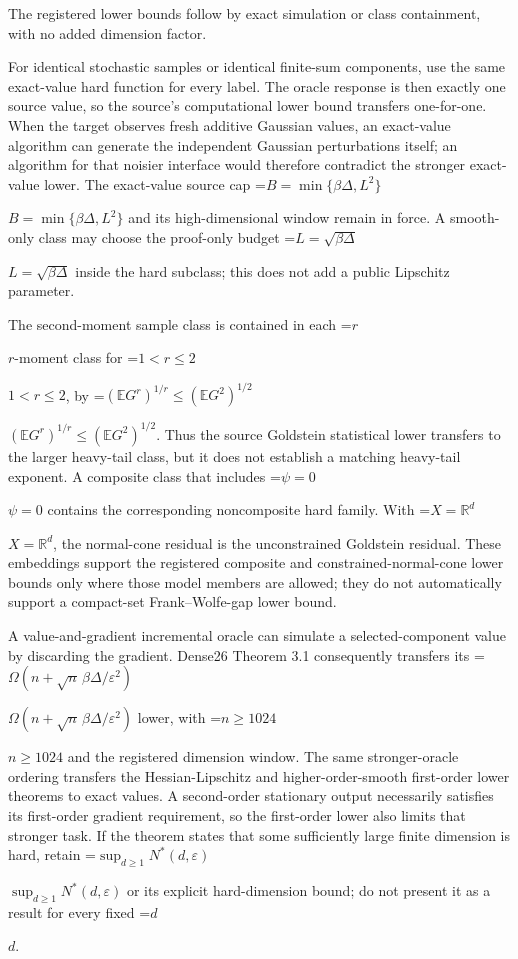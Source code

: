 \documentclass[10pt,a4paper]{article}
\newcommand{\AtlasMath}[1]{\par\begingroup\centering\setbox0=\hbox{$\displaystyle #1$}\ifdim\wd0>1.4\linewidth\typeout{ATLAS WIDE FORMULA: \the\wd0}\fi\ifdim\wd0>\linewidth\resizebox{\linewidth}{!}{\box0}\else\box0\fi\par\endgroup}
\newcommand{\AtlasInlineMath}[1]{\begingroup\setbox0=\hbox{$#1$}\ifdim\wd0>.4\linewidth\endgroup\AtlasMath{#1}\else\endgroup$#1$\fi}
\begin{document}
The registered lower bounds follow by exact simulation or class containment, with no added dimension factor.

For identical stochastic samples or identical finite-sum components, use the same exact-value hard function for every label. The oracle response is then exactly one source value, so the source's computational lower bound transfers one-for-one. When the target observes fresh additive Gaussian values, an exact-value algorithm can generate the independent Gaussian perturbations itself; an algorithm for that noisier interface would therefore contradict the stronger exact-value lower. The exact-value source cap \AtlasInlineMath{B=\min\{\beta\Delta,L^2\}} and its high-dimensional window remain in force. A smooth-only class may choose the proof-only budget \AtlasInlineMath{L=\sqrt{\beta\Delta}} inside the hard subclass; this does not add a public Lipschitz parameter.

The second-moment sample class is contained in each \AtlasInlineMath{r}-moment class for \AtlasInlineMath{1<r\le2}, by \AtlasInlineMath{(\mathbb EG^r)^{1/r}\le(\mathbb EG^2)^{1/2}}. Thus the source Goldstein statistical lower transfers to the larger heavy-tail class, but it does not establish a matching heavy-tail exponent. A composite class that includes \AtlasInlineMath{\psi=0} contains the corresponding noncomposite hard family. With \AtlasInlineMath{X=\mathbb R^d}, the normal-cone residual is the unconstrained Goldstein residual. These embeddings support the registered composite and constrained-normal-cone lower bounds only where those model members are allowed; they do not automatically support a compact-set Frank--Wolfe-gap lower bound.

A value-and-gradient incremental oracle can simulate a selected-component value by discarding the gradient. Dense26 Theorem 3.1 consequently transfers its \AtlasInlineMath{\Omega(n+\sqrt n\,\beta\Delta/\varepsilon^2)} lower, with \AtlasInlineMath{n\ge1024} and the registered dimension window. The same stronger-oracle ordering transfers the Hessian-Lipschitz and higher-order-smooth first-order lower theorems to exact values. A second-order stationary output necessarily satisfies its first-order gradient requirement, so the first-order lower also limits that stronger task. If the theorem states that some sufficiently large finite dimension is hard, retain \AtlasInlineMath{\sup_{d\ge1}N^*(d,\varepsilon)} or its explicit hard-dimension bound; do not present it as a result for every fixed \AtlasInlineMath{d}.
\end{document}
